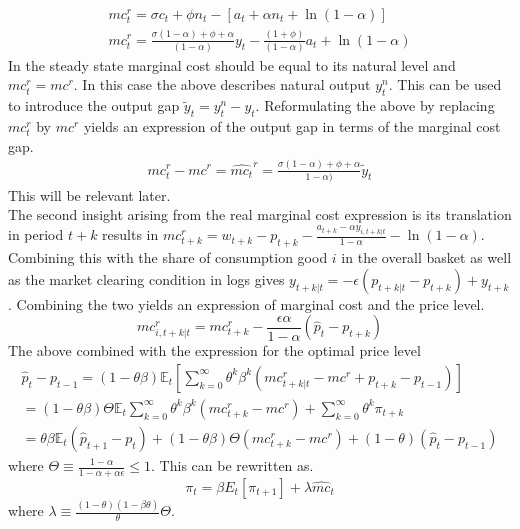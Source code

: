 \documentclass[12pt,a4paper,english]{article} %
\newcommand{\E}{\mathbb{E}} %
\begin{document}
	\begin{equation}
		\begin{aligned}
			mc_t^r = \sigma c_t + \phi n_t - [a_t + \alpha n_t + \ln(1-\alpha)] \\
			mc_t^r = 
			\frac{
				\sigma (1 - \alpha) + \phi + \alpha
			}{
				(1 - \alpha)	
			}	 y_t
			- \frac{
				(1 + \phi)	
			}{
				(1 - \alpha)	
			} a_t
			+ \ln(1-\alpha)
		\end{aligned}
	\end{equation}
	In the steady state marginal cost should be equal to its natural level and $mc_t^r = mc^r$. In this case the above describes natural output $y_t^n$. This can be used to introduce the output gap $\tilde{y}_t = y_t^n - y_t$. Reformulating the above by replacing $mc_t^r$ by $mc^r$ yields an expression of the output gap in terms of the marginal cost gap. 
	\begin{equation}
		\begin{aligned}
			mc_t^r - mc^r = \hat{mc_t}^r = \frac{\sigma (1 - \alpha) + \phi + \alpha}
			{1 - \alpha)} \tilde{y}_t
		\end{aligned}
	\end{equation}
	This will be relevant later.\\
	

	The second insight arising from the real marginal cost  expression is its translation in period $t+k$ results in $mc_{t+k}^r = w_{t+k} - p_{t+k} - \frac{a_ {t+k} - \alpha y_{i,t+k|t}}{1 - \alpha} - \ln(1 - \alpha)$. Combining this with the share of consumption good $i$ in the overall basket as well as the market clearing condition in logs gives $y_{t+k|t} = -\epsilon(p_{t+k|t} - p_{t+k}) + y_{t+k}$. Combining the two yields an expression of marginal cost and the price level.
	\begin{equation}
		mc_{i, t+k|t}^r = mc_{t+k}^r - \frac{\epsilon \alpha}{1 - \alpha}(\hat{p}_t - p_{t+k})
	\end{equation}
	The above combined with the expression for the optimal price level
	\begin{equation}
		\begin{aligned}
			\hat{p}_t - p_{t-1} =
			(1 - \theta \beta) \E_t
			\left[
			\sum_{k=0}^{\infty} \theta^k \beta^k \left( mc_{t+k|t}^r - mc^r +p_{t+k} - p_{t-1}\right)
			\right] \\			
			=
			(1 - \theta \beta) \Theta \E_t
			\sum_{k=0}^{\infty} \theta^k \beta^k (mc_{t+k}^r - mc^r) + 
			\sum_{k=0}^{\infty} \theta^k \pi_{t+k} \\
			=
			\theta \beta \E_t (\hat{p}_{t+1} - p_{t}) + (1 - \theta \beta) \Theta (mc_{t+k}^r - mc^r) + (1 - \theta) (\hat{p}_t - p_{t-1})
		\end{aligned}		
	\end{equation}
	where $\Theta \equiv \frac{1 - \alpha}{1 - \alpha + \alpha \epsilon} \leq 1$. This can be rewritten as.
	\begin{equation}
		\pi_t = \beta E_t [\pi_{t+1}] + \lambda \hat{mc}_{t}
	\end{equation}
	where $\lambda \equiv \frac{(1-\theta)(1-\beta\theta)}{\theta} \Theta$.
	
\end{document}

